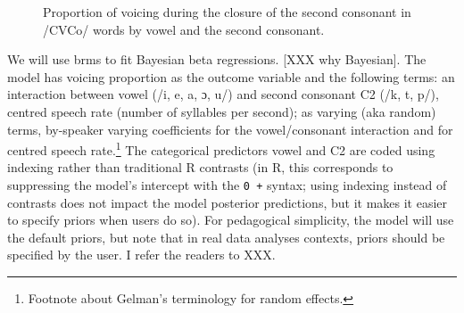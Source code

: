 \documentclass[
  authoryear,
  preprint,
  3p]{elsarticle}
\begin{document}
\begin{figure}


\caption{\label{fig-ita-egg}Proportion of voicing during the closure of
the second consonant in /CVCo/ words by vowel and the second consonant.}

\end{figure}%

We will use brms to fit Bayesian beta regressions. {[}XXX why
Bayesian{]}. The model has voicing proportion as the outcome variable
and the following terms: an interaction between vowel (/i, e, a, ɔ, u/)
and second consonant C2 (/k, t, p/), centred speech rate (number of
syllables per second); as varying (aka random) terms, by-speaker varying
coefficients for the vowel/consonant interaction and for centred speech
rate.\footnote{Footnote about Gelman's terminology for random effects.}
The categorical predictors vowel and C2 are coded using indexing rather
than traditional R contrasts (in R, this corresponds to suppressing the
model's intercept with the \texttt{0\ +} syntax; using indexing instead
of contrasts does not impact the model posterior predictions, but it
makes it easier to specify priors when users do so). For pedagogical
simplicity, the model will use the default priors, but note that in real
data analyses contexts, priors should be specified by the user. I refer
the readers to XXX.
\end{document}
